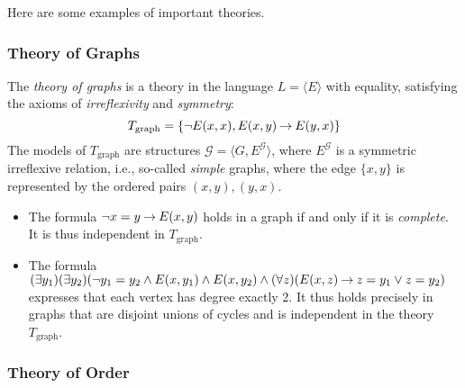 Here are some examples of important theories.

\subsubsection{Theory of Graphs}
The \emph{theory of graphs} is a theory in the language $L=\langle E\rangle$ with equality, satisfying the axioms of \emph{irreflexivity} and \emph{symmetry}:
$$
T_\text{graph}=\{\neg E(x, x),E(x,y)\mathbin{\rightarrow} E(y,x)\}
$$
The models of $T_\text{graph}$ are structures $\mathcal G=\langle G,E^\mathcal G\rangle$, where $E^\mathcal G$ is a symmetric irreflexive relation, i.e., so-called \emph{simple} graphs, where the edge $\{x,y\}$ is represented by the ordered pairs $(x,y),(y,x)$.
\begin{itemize}
    \item The formula $\neg x=y\mathbin{\rightarrow} E(x,y)$ holds in a graph if and only if it is \emph{complete}. It is thus independent in $T_\text{graph}$.
    \item The formula $(\exists y_1)(\exists y_2)(\neg y_1=y_2\land E(x,y_1)\land E(x,y_2)\land (\forall z)(E(x,z)\mathbin{\rightarrow} z=y_1\lor z=y_2)$ expresses that each vertex has degree exactly 2. It thus holds precisely in graphs that are disjoint unions of cycles and is independent in the theory $T_\text{graph}$.
\end{itemize}

\subsubsection{Theory of Order}

